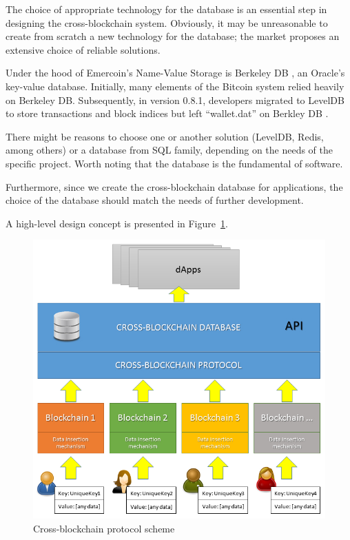 \begin{multicols}{2}
\vspace{-.3cm}

The choice of appropriate technology for the database is an essential step in designing the cross-blockchain system. Obviously, it may be unreasonable to create from scratch a new technology for the database; the market proposes an extensive choice of reliable solutions.

\vspace{-.1cm}

Under the hood of Emercoin’s Name-Value Storage is Berkeley DB \cite{art1-key36}, an Oracle’s key-value database. Initially, many elements of the Bitcoin system relied heavily on Berkeley DB. Subsequently, in version 0.8.1, developers migrated to LevelDB \cite{art1-key37} to store transactions and block indices but left “wallet.dat” on Berkley DB \cite{art1-key38}. 

\vspace{-.1cm}

There might be reasons to choose one or another solution (LevelDB, Redis, among others) or a database from SQL family, depending on the needs of the specific project. Worth noting that the database is the fundamental of software.

\vspace{-.1cm}

Furthermore, since we create the cross-blockchain database for applications, the choice of the database should match the needs of further development.

\vspace{-.1cm}

A high-level design concept is presented in Figure~\ref{chap1-fig04}.
\begin{figure}[H]
\centering
\includegraphics[scale=1.38]{src/Figures/chap1/chap1-fig04.jpg}
\caption{Cross-blockchain protocol scheme}\label{chap1-fig04}
\end{figure}


\end{multicols}
